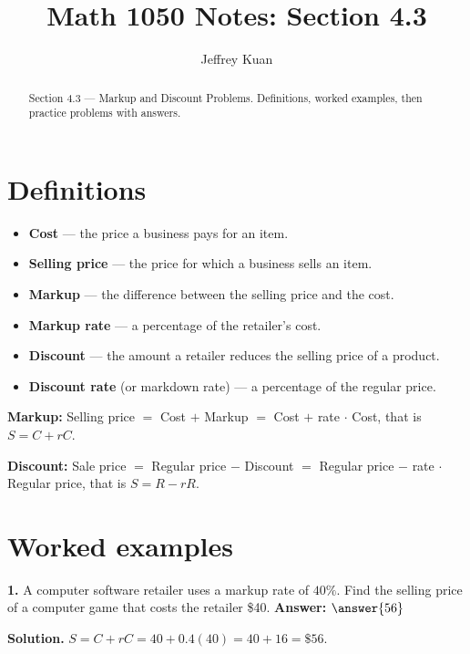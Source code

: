 \documentclass{ximera}
\author{Jeffrey Kuan}
\title{Math 1050 Notes: Section 4.3}
\begin{document}
\begin{abstract}
    Section 4.3 --- Markup and Discount Problems.
    Definitions, worked examples, then practice problems with answers.
\end{abstract}

\maketitle

\section*{Definitions}

\begin{itemize}
  \item \textbf{Cost} --- the price a business pays for an item.
  \item \textbf{Selling price} --- the price for which a business sells an item.
  \item \textbf{Markup} --- the difference between the selling price and the cost.
  \item \textbf{Markup rate} --- a percentage of the retailer's cost.
  \item \textbf{Discount} --- the amount a retailer reduces the selling price of a product.
  \item \textbf{Discount rate} (or markdown rate) --- a percentage of the regular price.
\end{itemize}

\textbf{Markup:} Selling price $=$ Cost $+$ Markup $=$ Cost $+$ rate $\cdot$ Cost, that is
$S=C+rC$.

\textbf{Discount:} Sale price $=$ Regular price $-$ Discount $=$ Regular price $-$ rate
$\cdot$ Regular price, that is $S=R-rR$.

\section*{Worked examples}

\begin{problem}
\textbf{1.} A computer software retailer uses a markup rate of $40\%$. Find the selling
price of a computer game that costs the retailer \$40.
\qquad \textbf{Answer:} $\answer{56}$

\begin{hint}
\textbf{Solution.} $S=C+rC=40+0.4(40)=40+16=\$56$.
\end{hint}
\end{problem}
\end{document}
